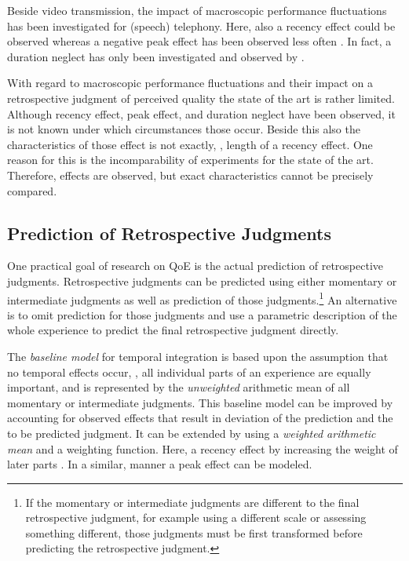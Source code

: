 Beside video transmission, the impact of macroscopic performance fluctuations has been investigated for (speech) telephony. %
Here, also a recency effect could be observed \citep[\eg,][]{rosenbluth_testing_1998, hamberg_time-varying_1999, gros_instantaneous_2001, gros_effects_2004, belmudez_audiovisual_2015, weiss_modeling_2009, lewcio_management_2014} whereas a negative peak effect has been observed less often \citep[\eg,][]{weiss_modeling_2009, belmudez_audiovisual_2015, lewcio_management_2014}.
In fact, a duration neglect has only been investigated and observed by \citet{rosenbluth_testing_1998}.

With regard to macroscopic performance fluctuations and their impact on a retrospective judgment of perceived quality the state of the art is rather limited.
Although recency effect, peak effect, and duration neglect have been observed, it is not known under which circumstances those occur.
Beside this also the characteristics of those effect is not exactly, \ie, length of a recency effect.
One reason for this is the incomparability of experiments for the state of the art.
Therefore, effects are observed, but exact characteristics cannot be precisely compared.

\subsection{Prediction of Retrospective Judgments}
One practical goal of research on \ac{QoE} is the actual prediction of retrospective judgments.
Retrospective judgments can be predicted using either momentary or intermediate judgments as well as prediction of those judgments.\footnote{If the momentary or intermediate judgments are different to the final retrospective judgment, for example using a different scale or assessing something different, those judgments must be first transformed before predicting the retrospective judgment.}
An alternative is to omit prediction for those judgments and use a parametric description of the whole experience to predict the final retrospective judgment directly.

The \emph{baseline model} for temporal integration is based upon the assumption that no temporal effects occur, \ie, all individual parts of an experience are equally important, and is represented by the \emph{unweighted} arithmetic mean of all momentary or intermediate judgments.
This baseline model can be improved by accounting for observed effects that result in deviation of the prediction and the to be predicted judgment.
It can be extended by using a \emph{weighted arithmetic mean} and a weighting function.
Here, a recency effect by increasing the weight of later parts \citep[][]{rosenbluth_testing_1998, weiss_modeling_2009, hamberg_time-varying_1999}.
In a similar, manner a peak effect can be modeled.

